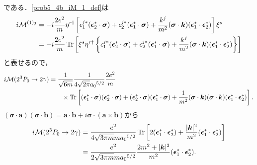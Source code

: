 である．\eqref{prob5_4b_iM_1_def}は
\begin{align*}
  i\mathcal{M}^{(1)j} &= -i \frac{2e^2}{m} \eta^{r\dagger} \left[ \epsilon_1^{j\ast} (\boldsymbol{\epsilon}_2^\ast \cdot \boldsymbol\sigma)
  + \epsilon_2^{j\ast} (\boldsymbol{\epsilon}_1^\ast \cdot \boldsymbol\sigma)
  + \frac{k^j}{m^2} (\boldsymbol\sigma \cdot \boldsymbol{k})(\boldsymbol{\epsilon}_1^\ast \cdot \boldsymbol{\epsilon}_2^\ast)
  \right] \xi^s \\
  &= -i \frac{2e^2}{m} \operatorname{Tr} \left[ \xi^s \eta^{r\dagger} \left\{ \epsilon_1^{j\ast} (\boldsymbol{\epsilon}_2^\ast \cdot \boldsymbol\sigma)
  + \epsilon_2^{j\ast} (\boldsymbol{\epsilon}_1^\ast \cdot \boldsymbol\sigma)
  + \frac{k^j}{m^2} (\boldsymbol\sigma \cdot \boldsymbol{k})(\boldsymbol{\epsilon}_1^\ast \cdot \boldsymbol{\epsilon}_2^\ast)
  \right\} \right]
\end{align*}
と表せるので，
\begin{align*}
  i\mathcal{M}(2^3P_0 \to 2\gamma) &= \frac{1}{\sqrt{6m}} \frac{1}{4\sqrt{2\pi} a_0{}^{5/2}} \frac{2e^2}{m} \\
  & \qquad \times \operatorname{Tr} \left[ (\boldsymbol{\epsilon}_1^\ast \cdot \boldsymbol\sigma) (\boldsymbol{\epsilon}_2^\ast \cdot \boldsymbol\sigma)
  + (\boldsymbol{\epsilon}_2^\ast \cdot \boldsymbol\sigma)(\boldsymbol{\epsilon}_1^\ast \cdot \boldsymbol\sigma)
  + \frac{1}{m^2} (\boldsymbol\sigma \cdot \boldsymbol{k})(\boldsymbol\sigma \cdot \boldsymbol{k})(\boldsymbol{\epsilon}_1^\ast \cdot \boldsymbol{\epsilon}_2^\ast)
  \right] .
\end{align*}
$(\boldsymbol\sigma \cdot \boldsymbol{a}) (\boldsymbol\sigma \cdot \boldsymbol{b}) = \boldsymbol{a} \cdot \boldsymbol{b} + i \boldsymbol\sigma \cdot (\boldsymbol{a} \times \boldsymbol{b})$から
\begin{align*}
  i\mathcal{M}(2^3P_0 \to 2\gamma) &= \frac{e^2}{4\sqrt{3\pi m}m a_0{}^{5/2}} \operatorname{Tr} \left[ 2(\boldsymbol{\epsilon}_1^\ast \cdot \boldsymbol{\epsilon}_2^\ast)
  + \frac{\lvert\boldsymbol{k}\rvert^2}{m^2} (\boldsymbol{\epsilon}_1^\ast \cdot \boldsymbol{\epsilon}_2^\ast)
  \right] \\
  &= \frac{e^2}{2\sqrt{3\pi m}m a_0{}^{5/2}} \frac{2m^2 + \lvert\boldsymbol{k}\rvert^2}{m^2} (\boldsymbol{\epsilon}_1^\ast \cdot \boldsymbol{\epsilon}_2^\ast) .
\end{align*}

